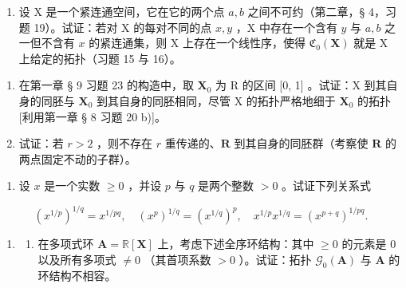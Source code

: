 \begin{enumerate}
\def\labelenumi{\alph{enumi})}
\setcounter{enumi}{1}
\tightlist
\item
设 X 是一个紧连通空间，它在它的两个点 \(a, b\) 之间不可约（第二章，§ 4，习题 19）。试证：若对 X 的每对不同的点 \(x, y\) ，X 中存在一个含有 \(y\) 与 \(a, b\) 之一但不含有 \(x\) 的紧连通集，则 X 上存在一个线性序，使得 \(\mathfrak{C}_{0}(\mathbf{X})\) 就是 X 上给定的拓扑（习题 15 与 16）。
\end{enumerate}

\begin{enumerate}
\def\labelenumi{\arabic{enumi})}
\setcounter{enumi}{19}
\item
在第一章 § 9 习题 23 的构造中，取 \(\mathbf{X}_0\) 为 R 的区间 {[}0, 1{]} 。试证：X 到其自身的同胚与 \(\mathbf{X}_0\) 到其自身的同胚相同，尽管 X 的拓扑严格地细于 \(\mathbf{X}_0\) 的拓扑{[}利用第一章 § 8 习题 20 b){]}。
\item
试证：若 \(r > 2\) ，则不存在 \(r\) 重传递的、\(\mathbf{R}\) 到其自身的同胚群（考察使 \(\mathbf{R}\) 的两点固定不动的子群）。
\end{enumerate}

\BourbakiExerciseGroup

\begin{enumerate}
\def\labelenumi{\arabic{enumi})}
\tightlist
\item
设 \(x\) 是一个实数 \(\geqslant 0\) ，并设 \(p\) 与 \(q\) 是两个整数 \(> 0\) 。试证下列关系式
\end{enumerate}

\[
(x ^ {1 / p}) ^ {1 / q} = x ^ {1 / p q}, \quad (x ^ {p}) ^ {1 / q} = (x ^ {1 / q}) ^ {p}, \quad x ^ {1 / p} x ^ {1 / q} = (x ^ {p + q}) ^ {1 / p q}.
\]

\begin{enumerate}
\def\labelenumi{\arabic{enumi})}
\setcounter{enumi}{1}
\tightlist
\item
  \begin{enumerate}
  \def\labelenumii{\alph{enumii})}
  \tightlist
  \item
在多项式环 \(\mathbf{A} = \mathbb{R}[\mathbf{X}]\) 上，考虑下述全序环结构：其中 \(\geqslant 0\) 的元素是 \(0\) 以及所有多项式 \(\neq 0\) （其首项系数 \(>0\) ）。试证：拓扑 \(\mathcal{G}_{0}(\mathbf{A})\) 与 \(\mathbf{A}\) 的环结构不相容。
  \end{enumerate}
\end{enumerate}

